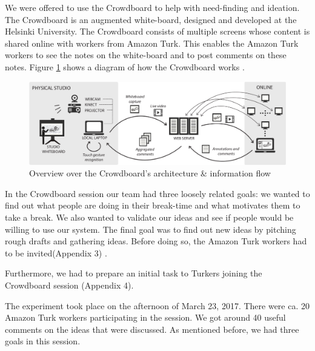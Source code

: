 We were offered to use the Crowdboard to help with  need-finding and ideation. The Crowdboard is an augmented white-board, designed and developed at the Helsinki University. The Crowdboard consists of multiple screens whose content is shared online with workers from Amazon Turk. This enables the Amazon Turk workers to see the notes on the white-board and to post comments on these notes. Figure \ref{fig:crowdboard-diagram} shows a diagram of how the Crowdboard works \cite{crowdboard}. 

\begin{figure}[h]
 \centering
 \includegraphics[width=\textwidth]{images/crowdboard-diagram.png}
 \caption{Overview over the Crowdboard's architecture \& information flow \cite{crowdboard}}
 \label{fig:crowdboard-diagram}
\end{figure}




In the Crowdboard session our team had three loosely related goals: we wanted to find out what people are doing in their break-time and what motivates them to take a break. We also wanted to validate our ideas and see if people would be willing to use our system. The final goal was to find out new ideas by pitching rough drafts and gathering ideas. Before doing so, the Amazon Turk workers had to be invited(Appendix 3) .

Furthermore, we had to prepare an initial task to Turkers joining the Crowdboard session (Appendix 4).

The experiment took place on the afternoon of March 23, 2017. There were ca. 20 Amazon Turk workers participating in the session. We got around 40 useful comments on the ideas that were discussed. As mentioned before, we had three goals in this session.

